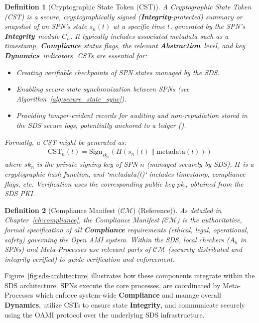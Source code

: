 \documentclass[12pt,a4paper]{report}
\renewcommand{\citep}[1]{\textit{\scriptsize{(\cite{#1})}}}
\newtheorem{definition}{Definition}[section]
\newcommand{\Integrity}{\textbf{Integrity}}
\newcommand{\Abstraction}{\textbf{Abstraction}}
\newcommand{\Dynamics}{\textbf{Dynamics}}
\begin{document}
	\begin{definition}[Cryptographic State Token (CST)]
		\label{def:cst_sds}
		A Cryptographic State Token (CST) is a secure, cryptographically signed (\Integrity-protected) summary or snapshot of an SPN's state $s_n(t)$ at a specific time $t$, generated by the SPN's \Integrity\ module $C_n$. It typically includes associated metadata such as a timestamp, \textbf{Compliance} status flags, the relevant \Abstraction\ level, and key \Dynamics\ indicators. CSTs are essential for:
		\begin{itemize}[noitemsep]
			\item Creating verifiable checkpoints of SPN states managed by the SDS.
			\item Enabling secure state synchronization between SPNs (see Algorithm~\ref{alg:secure_state_sync}).
			\item Providing tamper-evident records for auditing and non-repudiation stored in the SDS secure logs, potentially anchored to a ledger \citep{ProML_Provenance_2022}.
		\end{itemize}
		Formally, a CST might be generated as:
		\begin{align}
			\text{CST}_n(t) = \text{Sign}_{sk_n}(H(s_n(t) \| \text{metadata}(t))) \label{eq:cst_generation}
		\end{align}
		where $sk_n$ is the private signing key of SPN $n$ (managed securely by SDS), $H$ is a cryptographic hash function, and `metadata(t)` includes timestamp, compliance flags, etc. Verification uses the corresponding public key $pk_n$ obtained from the SDS PKI.
	\end{definition}
	
	\begin{definition}[Compliance Manifest ($\mathcal{CM}$) (Reference)]
		\label{def:cm_ref}
		As detailed in Chapter~\ref{ch:compliance}, the Compliance Manifest ($\mathcal{CM}$) is the authoritative, formal specification of all \textbf{Compliance} requirements (ethical, legal, operational, safety) governing the Open AMI system. Within the SDS, local checkers ($A_n$ in SPNs) and Meta-Processes use relevant parts of $\mathcal{CM}$ (securely distributed and integrity-verified) to guide verification and enforcement.
	\end{definition}
	
	Figure~\ref{fig:sds-architecture} illustrates how these components integrate within the SDS architecture. SPNs execute the core processes, are coordinated by Meta-Processes which enforce system-wide \textbf{Compliance} and manage overall \Dynamics, utilize CSTs to ensure state \Integrity, and communicate securely using the OAMI protocol over the underlying SDS infrastructure.
	
\end{document}
